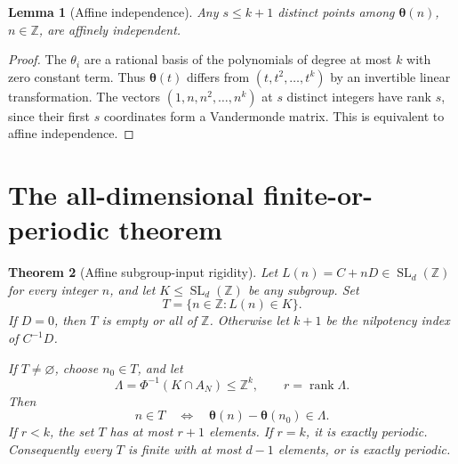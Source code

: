 \documentclass[11pt,letterpaper]{article}
\newtheorem{theorem}{Theorem}[section]
\newtheorem{lemma}[theorem]{Lemma}
\theoremstyle{definition}
\theoremstyle{remark}
\newcommand{\Z}{\mathbb Z}
\newcommand{\SL}{\operatorname{SL}}
\newcommand{\rank}{\operatorname{rank}}
\newcommand{\vv}{\boldsymbol\theta}
\begin{document}
\begin{lemma}[Affine independence]\label{gts:ai:lem:moment}
Any $s\le k+1$ distinct points among $\vv(n)$, $n\in\Z$, are affinely independent.
\end{lemma}
\begin{proof}
The $\theta_i$ are a rational basis of the polynomials of degree at most $k$ with zero constant term. Thus $\vv(t)$ differs from $(t,t^2,\ldots,t^k)$ by an invertible linear transformation. The vectors $(1,n,n^2,\ldots,n^k)$ at $s$ distinct integers have rank $s$, since their first $s$ coordinates form a Vandermonde matrix. This is equivalent to affine independence.
\end{proof}

\section{The all-dimensional finite-or-periodic theorem}\label{gts:ai:sec:rigidity}
\begin{theorem}[Affine subgroup-input rigidity]\label{gts:ai:thm:rigidity}
Let $L(n)=C+nD\in\SL_d(\Z)$ for every integer $n$, and let $K\le\SL_d(\Z)$ be any subgroup. Set
\[
 T=\{n\in\Z:L(n)\in K\}.
\]
If $D=0$, then $T$ is empty or all of $\Z$. Otherwise let $k+1$ be the nilpotency index of $C^{-1}D$.

If $T\ne\varnothing$, choose $n_0\in T$, and let
\begin{equation}\label{gts:ai:eq:lattice}
 \Lambda=\Phi^{-1}(K\cap A_N)\le\Z^k,
 \qquad r=\rank\Lambda.
\end{equation}
Then
\begin{equation}\label{gts:ai:eq:cosetlattice}
 n\in T\quad\Longleftrightarrow\quad
 \vv(n)-\vv(n_0)\in\Lambda.
\end{equation}
If $r<k$, the set $T$ has at most $r+1$ elements. If $r=k$, it is exactly periodic. Consequently every $T$ is finite with at most $d-1$ elements, or is exactly periodic.
\end{theorem}
\end{document}
